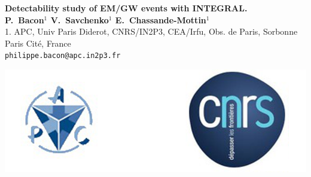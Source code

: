 \documentclass[a0,portrait]{a0poster}
\begin{document}


\begin{minipage}[b]{0.75\linewidth}
  \Huge \textbf{Detectability study of EM/GW events with INTEGRAL.}\\[1cm] %
  \large \textbf{P.~Bacon$^{1}$ V.~Savchenko$^{1}$  E.~Chassande-Mottin$^{1}$}\\[1cm] %
  \normalsize 1. APC, Univ Paris Diderot, CNRS/IN2P3, CEA/Irfu, Obs. de Paris, Sorbonne Paris Cit\'e, France\\
  \large \texttt{philippe.bacon@apc.in2p3.fr}\\
\end{minipage}
%
\begin{minipage}[b]{0.25\linewidth}
	\includegraphics[scale=.8]{logo.png}
\end{minipage}

\vspace{1cm} %

\end{document}
